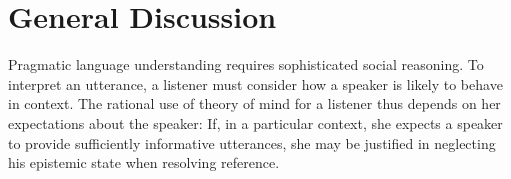 \documentclass[manuscript]{stjour}
\begin{document}
%
%

\section{General Discussion}

Pragmatic language understanding requires sophisticated social reasoning. To interpret an utterance, a listener must consider how a speaker is likely to behave in context.
The rational use of theory of mind for a listener thus depends on her expectations about the speaker: If, in a particular context, she expects a speaker to provide sufficiently informative utterances, she may be justified in neglecting his epistemic state when resolving reference.
\end{document}
